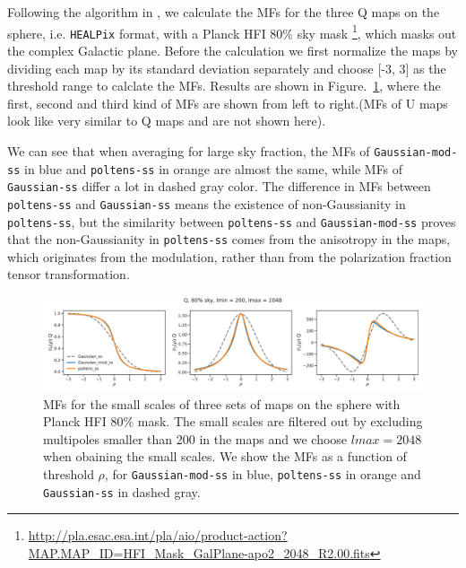 \documentclass[twocolumn]{aastex631}
\begin{document}
Following the algorithm in \cite{2022OJAp....5E..13G}, we calculate the MFs for the three Q maps on the sphere, i.e. \texttt{HEALPix} format, with a Planck HFI 80\% sky mask \footnote{\url{http://pla.esac.esa.int/pla/aio/product-action?MAP.MAP_ID=HFI_Mask_GalPlane-apo2_2048_R2.00.fits}}, which masks out the complex Galactic plane.  Before the calculation we first normalize the maps by dividing each map by its standard deviation separately and choose [-3, 3] as the threshold range to calclate the MFs. Results are shown in Figure.~\ref{fig:MF:sphere}, where the first, second and third kind of MFs are shown from left to right.(MFs of U maps look like very similar to Q maps and are not shown here). 

We can see that when averaging for large sky fraction, the MFs of \texttt{Gaussian-mod-ss} in blue and \texttt{poltens-ss} in orange are almost the same, while MFs of \texttt{Gaussian-ss} differ a lot in dashed gray color. The difference in MFs between \texttt{poltens-ss} and \texttt{Gaussian-ss} means the existence of non-Gaussianity in \texttt{poltens-ss}, but the similarity between \texttt{poltens-ss} and \texttt{Gaussian-mod-ss} proves that the non-Gaussianity in \texttt{poltens-ss} comes from the anisotropy in the maps, which originates from the modulation, rather than from the polarization fraction tensor transformation.   

\begin{figure}[hbt!]
    \centering
    \includegraphics[width=180mm]{figures/MFs_80p_sky_Q.pdf}
    \caption{MFs for the small scales of three sets of maps on the sphere with Planck HFI 80\% mask. The small scales are filtered out by excluding multipoles smaller than 200 in the maps and we choose $lmax = 2048$ when obaining the small scales. We show the MFs as a function of threshold $\rho$, for \texttt{Gaussian-mod-ss} in blue, \texttt{poltens-ss} in orange and  \texttt{Gaussian-ss} in dashed gray.}
    \label{fig:MF:sphere}
\end{figure}
\end{document}
